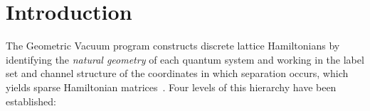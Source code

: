 \documentclass[aps,pra,twocolumn,superscriptaddress,longbibliography,floatfix]{revtex4-2}
\begin{document}
\maketitle

\section{Introduction}
\label{sec:intro}

The Geometric Vacuum program constructs discrete lattice
Hamiltonians by identifying the \emph{natural geometry} of each
quantum system and working in the label set and channel structure of the
coordinates in which separation occurs, which yields sparse Hamiltonian
matrices~\cite{paper0,paper1,paper7}.
Four levels of this hierarchy have been established:
\end{document}
